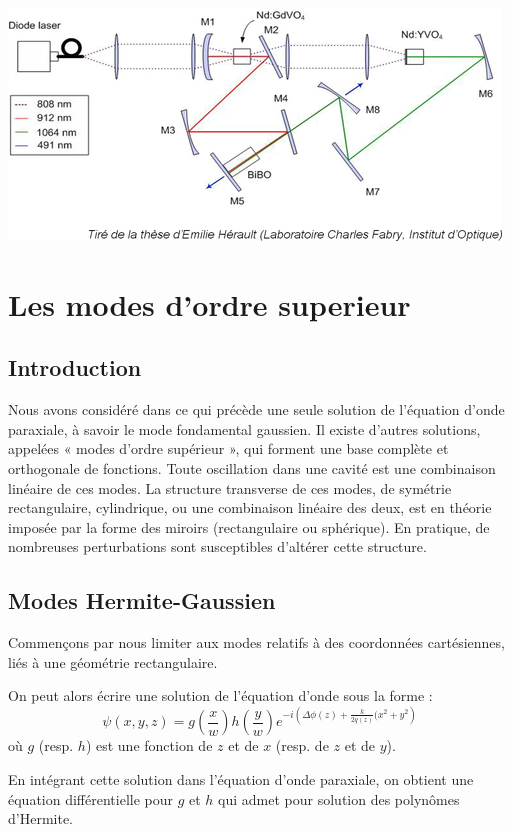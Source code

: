 \documentclass{book}
\begin{document}
{\centering
\includegraphics[scale=1.7]{images/fig18.jpg}
\par}

\section{Les modes d'ordre superieur}
\subsection{Introduction}
Nous avons considéré dans ce qui précède une seule solution de l'équation d'onde paraxiale, à savoir le mode fondamental gaussien. Il existe d'autres solutions, appelées « modes d'ordre supérieur », qui forment une base complète et orthogonale de fonctions. Toute oscillation dans une cavité est une combinaison linéaire de ces modes. La structure transverse de ces modes, de symétrie rectangulaire, cylindrique, ou une combinaison linéaire des deux, est en théorie imposée par la forme des miroirs (rectangulaire ou sphérique). En pratique, de nombreuses perturbations sont susceptibles d'altérer cette structure. 

\subsection{Modes Hermite-Gaussien}


Commençons par nous limiter aux modes relatifs à des coordonnées cartésiennes, liés à une géométrie rectangulaire.

On peut alors écrire une solution de l'équation d'onde sous la forme :
\[\psi(x, y, z) = g\left(\frac xw\right) h\left(\frac yw\right)e^{-i\left(\Delta\phi(z)+\frac
k{2q(z)}(x^2+y^2\right)}\]
où \(g\) (resp. \(h\)) est une fonction de \(z\) et de \(x\) (resp. de \(z\) et de \(y\)).

En intégrant cette solution dans l'équation d'onde paraxiale, on obtient une équation différentielle pour \(g\) et \(h\) qui admet pour solution des polynômes d'Hermite.
\end{document}
